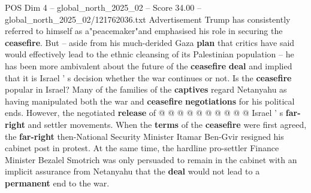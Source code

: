 \begin{textsample}{POS Dim 4 – global\_north\_2025\_02 – Score 34.00 – global\_north\_2025\_02/121762036.txt}
Advertisement Trump has consistently referred to himself as a"peacemaker"and emphasised his role in securing the \textbf{ceasefire}.
But -- aside from his much-derided Gaza \textbf{plan} that critics have said would effectively lead to the ethnic cleansing of its Palestinian population -- he has been more ambivalent about the future of the \textbf{ceasefire} \textbf{deal} and implied that it is Israel ' s decision whether the war continues or not.
Is the \textbf{ceasefire} popular in Israel?
Many of the families of the \textbf{captives} regard Netanyahu as having manipulated both the war and \textbf{ceasefire} \textbf{negotiations} for his political ends.
However, the negotiated \textbf{release} of @ @ @ @ @ @ @ @ @ @ Israel ' s \textbf{far-right} and settler movements.
When the \textbf{terms} of the \textbf{ceasefire} were first agreed, the \textbf{far-right} then-National Security Minister Itamar Ben-Gvir resigned his cabinet post in protest.
At the same time, the hardline pro-settler Finance Minister Bezalel Smotrich was only persuaded to remain in the cabinet with an implicit assurance from Netanyahu that the \textbf{deal} would not lead to a \textbf{permanent} end to the war.

\end{textsample}
